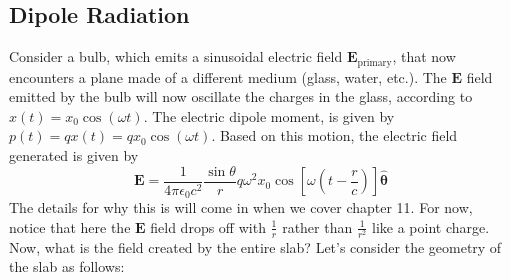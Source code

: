 \subsection{Dipole Radiation}
Consider a bulb, which emits a sinusoidal electric field \( \mathbf{E}_\text{primary} \), that now encounters
a plane made of a different medium (glass, water, etc.). The \( \mathbf{E} \) field emitted by the bulb will
now oscillate the charges in the glass, according to \( x(t) = x_0 \cos( \omega t) \). The electric dipole
moment, is given by \( p(t) = qx(t) = qx_0 \cos (\omega t) \). Based on this motion, the electric field
generated is given by
\[
	\mathbf{E} = \frac{1}{4 \pi \epsilon_0 c^2}\frac{\sin \theta}{r} q \omega^2 x_0 \cos\left[ \omega\left(t -
	\frac{r}{c}\right) \right] \hat{\boldsymbol{\theta}}
\]
The details for why this is will come in when we cover chapter 11. For now, notice that here the \(
\mathbf{E} \) field drops off with \( \frac{1}{r} \) rather than \( \frac{1}{r^2} \) like a point charge.
Now, what is the field created by the entire slab? Let's consider the geometry of the slab as follows:

\begin{center}
\end{center}

